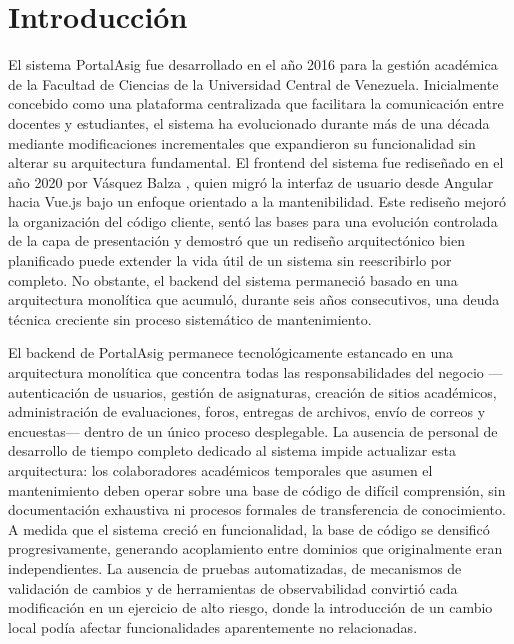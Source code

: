 \chapter*{Introducci\'{o}n}

El sistema PortalAsig fue desarrollado en el a\~{n}o 2016 para la gesti\'{o}n
acad\'{e}mica de la Facultad de Ciencias de la Universidad Central de Venezuela.
Inicialmente concebido como una plataforma centralizada que facilitara la
comunicaci\'{o}n entre docentes y estudiantes, el sistema ha evolucionado durante
m\'{a}s de una d\'{e}cada mediante modificaciones incrementales que expandieron su
funcionalidad sin alterar su arquitectura fundamental. El frontend del sistema
fue redise\~{n}ado en el a\~{n}o 2020 por V\'{a}squez Balza \cite{teg_rafael}, quien
migr\'{o} la interfaz de usuario desde Angular hacia Vue.js bajo un enfoque
orientado a la mantenibilidad. Este redise\~{n}o mejor\'{o} la
organizaci\'{o}n del c\'{o}digo cliente, sent\'{o} las bases para una evoluci\'{o}n
controlada de la capa de presentaci\'{o}n y demostr\'{o} que un redise\~{n}o
arquitect\'{o}nico bien planificado puede extender la vida \'{u}til de un sistema sin
reescribirlo por completo. No obstante, el backend del sistema permaneci\'{o}
basado en una arquitectura monol\'{i}tica que acumul\'{o}, durante seis a\~{n}os
consecutivos, una deuda t\'{e}cnica creciente sin proceso sistem\'{a}tico de
mantenimiento.

El backend de PortalAsig permanece tecnol\'{o}gicamente estancado en una
arquitectura monol\'{i}tica que concentra todas las responsabilidades del
negocio ---autenticaci\'{o}n de usuarios, gesti\'{o}n de asignaturas, creaci\'{o}n de
sitios acad\'{e}micos, administraci\'{o}n de evaluaciones, foros, entregas de
archivos, env\'{i}o de correos y encuestas--- dentro de un \'{u}nico proceso
desplegable. La ausencia de personal de desarrollo de tiempo completo dedicado
al sistema impide actualizar esta arquitectura: los colaboradores acad\'{e}micos
temporales que asumen el mantenimiento deben operar sobre una base de c\'{o}digo de
dif\'{i}cil comprensi\'{o}n, sin documentaci\'{o}n exhaustiva ni procesos formales de
transferencia de conocimiento. A medida que el sistema creci\'{o} en funcionalidad,
la base de c\'{o}digo se densific\'{o} progresivamente, generando acoplamiento entre
dominios que originalmente eran independientes. La ausencia de pruebas
automatizadas, de mecanismos de validaci\'{o}n de cambios y de herramientas de
observabilidad convirti\'{o} cada modificaci\'{o}n en un ejercicio de alto riesgo, donde
la introducci\'{o}n de un cambio local pod\'{i}a afectar funcionalidades aparentemente no
relacionadas.


